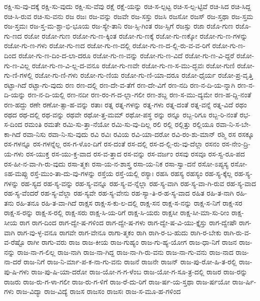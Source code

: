 {ರಕ್ಷಿ-ಸು-ವು-ದಕ್ಕೆ
ರಕ್ಷಿ-ಸು-ವುದು
ರಕ್ಷಿ-ಸು-ವೆವು
ರಕ್ಷೆ
ರಕ್ಷೆ-ಯನ್ನು
ರಚಿ-ಸ-ಲ್ಪಟ್ಟ
ರಚಿ-ಸ-ಲ್ಪ-ಟ್ಟಿವೆ
ರಚಿ-ಸಿದ
ರಚಿ-ಸಿದ್ದ
ರಚಿ-ಸಿ-ರುವ
ರಚಿ-ಸು-ವನು
ರಜ
ರಜಃ
ರಜ-ವನ್ನು
ರಜವೇ
ರಜ-ಸಸ್ತು
ರಜಸಿ
ರಜಸೋ
ರಜಸ್
ರಜ-ಸ್ತಥಾ
ರಜ-ಸ್ತಮ
ರಜ-ಸ್ತಮಃ
ರಜ-ಸ್ತ-ಮ-ಶ್ಚಾ-ಭಿ-ಭೂಯ
ರಜ-ಸ್ಯೇ-ತಾನಿ
ರಜ-ಸ್ಸಿ-ಗಿಂತ
ರಜ-ಸ್ಸಿಗೆ
ರಜಸ್ಸು
ರಜಾ
ರಜೊ-ಗುಣ
ರಜೊ-ಗು-ಣದ
ರಜೋ
ರಜೋ-ಗುಣ
ರಜೋ-ಗು-ಣ-ಕ್ಕಿಂತ
ರಜೋ-ಗು-ಣಕ್ಕೆ
ರಜೋ-ಗು-ಣಕ್ಕೋ
ರಜೋ-ಗು-ಣ-ಗಳನ್ನು
ರಜೋ-ಗು-ಣ-ಗಳು
ರಜೋ-ಗು-ಣದ
ರಜೋ-ಗು-ಣ-ದಲ್ಲಿ
ರಜೋ-ಗು-ಣ-ದ-ಲ್ಲಿ-ರು-ವ-ವ-ರಿಗೆ
ರಜೋ-ಗು-ಣ-ದಿಂದ
ರಜೋ-ಗು-ಣ-ದಿಂ-ದ-ಲಾ-ದರೂ
ರಜೋ-ಗು-ಣ-ವನ್ನು
ರಜೋ-ಗು-ಣ-ವಿದೆ
ರಜೋ-ಗು-ಣ-ವಿ-ದ್ದರೆ
ರಜೋ-ಗು-ಣ-ವಿಲ್ಲ
ರಜೋ-ಗು-ಣ-ವಿ-ಲ್ಲ-ದ-ವನೂ
ರಜೋ-ಗು-ಣವೇ
ರಜೋ-ಗು-ಣ-ಸ-ಮು-ದ್ಭವಃ
ರಜೋ-ಗುಣಿ
ರಜೋ-ಗು-ಣಿ-ಗಳಲ್ಲಿ
ರಜೋ-ಗು-ಣಿ-ಗಳು
ರಜೋ-ಗು-ಣಿಯ
ರಜೋ-ಗು-ಣಿ-ಯಾ-ದರೂ
ರಜೋ-ಧೈರ್ಯ
ರಜೋ-ಪ್ರ-ವೃತ್ತಿ
ರಟ್ಟಾ-ಗಿದೆ
ರಟ್ಟಾ-ಗು-ವುದು
ರಣ
ರಣ-ದಲ್ಲಿ
ರಣ-ದೇ-ವ-ತೆಗೆ
ರಣ-ದೇ-ವಿಗೆ
ರಣ-ನದಿ
ರಣ-ನ-ದಿ-ಯ-ನ್ನಾಗಿ
ರಣ-ನ-ದಿ-ಯನ್ನು
ರಣ-ನ-ದಿ-ಯಲ್ಲಿ
ರಣ-ನದೀ
ರಣ-ರಂ-ಗ-ದ-ಲ್ಲಾ-ಗಲೀ
ರಣ-ಶಬ್ದ
ರಣ-ಸ-ಮು-ದ್ಯಮೇ
ರಣ-ಹ-ದ್ದಿ-ನಂತೆ
ರಣ-ಹದ್ದು
ರಣೇ
ರಣೋ-ತ್ಸಾ-ಹ-ವನ್ನು
ರತಾಃ
ರತ್ನ
ರತ್ನ-ಗಳನ್ನು
ರತ್ನ-ಗಳು
ರತ್ನ-ದಂತೆ
ರತ್ನ-ವನ್ನೆ
ರತ್ನ-ವಿದೆ
ರಥಂ
ರಥದ
ರಥ-ದಲ್ಲಿ
ರಥ-ವನ್ನು
ರಥವೇ
ರಥೋ-ತ್ತ-ಮಮ್
ರಥೋ-ಪಸ್ಥ
ರನ್ನು
ರನ್ನೂ
ರಬ್ಬ-ರಿಗೂ
ರಬ್ಬ-ರಿ-ನಂತೆ
ರಭ-ಸ-ದಿಂದ
ರಮಂತಿ
ರಮತೇ
ರಮಿ-ಸು-ತ್ತಾ-ನೆಯೋ
ರಮಿ-ಸು-ವು-ದಿಲ್ಲ
ರಲಿ
ರಲ್ಲಿ
ರಲ್ಲಿತ್ತು
ರಲ್ಲಿಯೂ
ರವಾ-ನಿ-ಸ-ಬೇ-ಕಾ-ಗಿದೆ
ರವಾ-ನಿಸು
ರವಾ-ನಿ-ಸು-ವುದು
ರವಿ
ರವಿಃ
ರವಿಯ
ರವಿ-ಯಾ-ದರೋ
ರವಿ-ರಂ-ಶು-ಮಾನ್
ರಶ್ಮಿ
ರಸ
ರಸಕ್ಕೂ
ರಸ-ಗಳನ್ನೂ
ರಸ-ಗಳನ್ನೆಲ್ಲ
ರಸ-ಗ-ಳೊಂ-ದಿಗೆ
ರಸ-ದಂತೆ
ರಸ-ದಲ್ಲಿ
ರಸ-ದ-ಲ್ಲಿ-ರು-ವು-ದೆಲ್ಲಾ
ರಸನಂ
ರಸ-ನೇಂ-ದ್ರಿ-ಯ-ಗಳು
ರಸ-ಯುಕ್ತ
ರಸ-ಯು-ಕ್ತ-ವಾದ
ರಸ-ವ-ತ್ತಾದ
ರಸ-ವನ್ನು
ರಸ-ವರ್ಜಂ
ರಸವು
ರಸವೂ
ರಸ-ಸ್ವ-ರೂ-ಪದ
ರಸ-ಹೀ-ನ-ವಾ-ಗಿ-ರು-ವುದು
ರಸಾ-ತ್ಮಕಃ
ರಸಾ-ಯ-ನ-ಶಾಸ್ತ್ರ
ರಸಾ-ಯ-ನಿಕ
ರಸಾ-ಸ್ವಾ-ದನೆ
ರಸೋ-ಽಪ್ಯಸ್ಯ
ರಸೋ-ಽಹ-ಮಪ್ಸು
ರಸ್ತೆ-ಮುಂ-ತಾ-ದು-ವು-ಗಳನ್ನು
ರಸ್ತೆಯ
ರಸ್ತೆ-ಯಲ್ಲಿ
ರಸ್ಯಾಃ
ರಹಸಿ
ರಹಸ್ಯ
ರಹಸ್ಯಂ
ರಹ-ಸ್ಯ-ಕ್ಕೆಲ್ಲ
ರಹ-ಸ್ಯ-ಗಳನ್ನು
ರಹ-ಸ್ಯದ
ರಹ-ಸ್ಯ-ವನ್ನು
ರಹ-ಸ್ಯ-ವನ್ನೂ
ರಹ-ಸ್ಯ-ವ-ನ್ನೆಲ್ಲಾ
ರಹ-ಸ್ಯ-ವಾಗಿ
ರಹ-ಸ್ಯ-ವಾ-ಗಿ-ರುವ
ರಹ-ಸ್ಯ-ವಾದ
ರಹ-ಸ್ಯ-ವೆಂದರೆ
ರಹ-ಸ್ಯ-ವೆಲ್ಲಾ
ರಹ-ಸ್ಯವೇ
ರಹ-ಸ್ಯ-ವೇನು
ರಹ-ಸ್ಯಾ-ತಿ-ರ-ಹ-ಸ್ಯ-ವಾದ
ರಹಿತ
ರಹಿ-ತ-ನಾಗಿ
ರಹಿ-ತನು
ರಹಿ-ತನೂ
ರಹಿ-ತ-ವಾ-ಗಿದೆ
ರಾಕ್ಷಸ
ರಾಕ್ಷ-ಸ-ಕು-ಲ-ದಲ್ಲಿ
ರಾಕ್ಷ-ಸನ
ರಾಕ್ಷ-ಸ-ನನ್ನು
ರಾಕ್ಷ-ಸ-ನಿಗೆ
ರಾಕ್ಷ-ಸರ
ರಾಕ್ಷ-ಸ-ರನ್ನು
ರಾಕ್ಷ-ಸ-ರಲ್ಲಿ
ರಾಕ್ಷ-ಸರು
ರಾಕ್ಷ-ಸಿ-ಯ-ರಿಗೆ
ರಾಕ್ಷ-ಸಿ-ಯರು
ರಾಕ್ಷಸೀ
ರಾಕ್ಷ-ಸೀ-ಮಾ-ಸು-ರೀಂ
ರಾಕ್ಷ-ಸೀಯ
ರಾಗ
ರಾಗ-ದಿಂದ
ರಾಗ-ದ್ವೇ-ಷ-ಗಳಿಂದ
ರಾಗ-ದ್ವೇ-ಷ-ಗಳು
ರಾಗ-ದ್ವೇ-ಷ-ವಿ-ಯು-ಕ್ತೈಸ್ತು
ರಾಗ-ದ್ವೇಷೌ
ರಾಗ-ವಾಗಿ
ರಾಗ-ವು-ಳ್ಳ-ವನೂ
ರಾಗವೇ
ರಾಗ-ವೇನೂ
ರಾಗಾ-ತ್ಮಕಂ
ರಾಗಿ
ರಾಗಿ-ರ-ಬ-ಹುದು
ರಾಗಿ-ರ-ಬೇಕು
ರಾಗಿ-ರು-ವ-ವ-ರೆಷ್ಟೊ
ರಾಗೀ
ರಾಗು-ವರು
ರಾಜ
ರಾಜ-ಕೀಯ
ರಾಜ-ಗುಹ್ಯಂ
ರಾಜ-ಗು-ಹ್ಯ-ಯೋಗ
ರಾಜ-ಧಾ-ನಿಗೆ
ರಾಜನ
ರಾಜ-ನನ್ನು
ರಾಜ-ನಾ-ಗ-ಲಿಲ್ಲ
ರಾಜ-ನಾಗಿ
ರಾಜ-ನಾ-ಗಿದ್ದ
ರಾಜ-ನಾ-ಗಿ-ರು-ವನು
ರಾಜ-ನಾ-ಗು-ವನು
ರಾಜ-ನಾದ
ರಾಜ-ನಾ-ದರೆ
ರಾಜ-ನಿಗೆ
ರಾಜ-ನಿ-ರ್ಮಾ-ಪ-ಕ-ನಾ-ಗು-ವನು
ರಾಜನೆ
ರಾಜನೇ
ರಾಜನ್
ರಾಜ-ಪು-ರೋ-ಹಿ-ತ-ರಲ್ಲಿ
ರಾಜ-ಪು-ಷಿ-ಗಳು
ರಾಜ-ಪು-ಷಿ-ಯಾ-ದರೋ
ರಾಜ-ಯೋ-ಗ-ಗ-ಳೆಂಬ
ರಾಜ-ಯೋ-ಗ-ಸೂ-ತ್ರ-ದಲ್ಲಿ
ರಾಜರ
ರಾಜ-ರನ್ನು
ರಾಜರು
ರಾಜ-ರು-ಗ-ಳಾ-ಗಲೀ
ರಾಜ-ರು-ಗ-ಳಿಗೆ
ರಾಜ-ರೆ-ದು-ರಿಗೆ
ರಾಜ-ರ್ಷ-ಯ-ಸ್ತಥಾ
ರಾಜ-ರ್ಷಯೋ
ರಾಜ-ರ್ಷಿ-ಗಳು
ರಾಜ-ವಿದ್ಯಾ
ರಾಜ-ವಿದ್ಯೆ
ರಾಜಸ
ರಾಜಸಂ
ರಾಜಸಃ
ರಾಜ-ಸ-ಮೂ-ಹ-ಗಳಿಂದ
}
